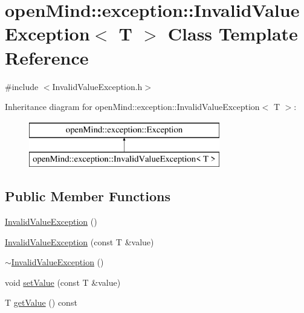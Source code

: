 \hypertarget{classopen_mind_1_1exception_1_1_invalid_value_exception}{\section{open\+Mind\+:\+:exception\+:\+:Invalid\+Value\+Exception$<$ T $>$ Class Template Reference}
\label{classopen_mind_1_1exception_1_1_invalid_value_exception}
}


{\ttfamily \#include $<$Invalid\+Value\+Exception.\+h$>$}

Inheritance diagram for open\+Mind\+:\+:exception\+:\+:Invalid\+Value\+Exception$<$ T $>$\+:\begin{figure}[H]
\begin{center}
\leavevmode
\includegraphics[height=2.000000cm]{classopen_mind_1_1exception_1_1_invalid_value_exception}
\end{center}
\end{figure}
\subsection*{Public Member Functions}
\begin{DoxyCompactItemize}
\item 
\hyperlink{classopen_mind_1_1exception_1_1_invalid_value_exception_a76941c40ec3cabdd0396138cd00471b6}{Invalid\+Value\+Exception} ()
\item 
\hyperlink{classopen_mind_1_1exception_1_1_invalid_value_exception_a30f06e903fb469a3317b7663a714f359}{Invalid\+Value\+Exception} (const T \&value)
\item 
\hyperlink{classopen_mind_1_1exception_1_1_invalid_value_exception_aceb1c7e40dd87bdfe095419994e11b30}{$\sim$\+Invalid\+Value\+Exception} ()
\item 
void \hyperlink{classopen_mind_1_1exception_1_1_invalid_value_exception_a2cec4d6ba69079526b2dff38ac3b5640}{set\+Value} (const T \&value)
\item 
T \hyperlink{classopen_mind_1_1exception_1_1_invalid_value_exception_aebf01f07e7550bc407d3cadc8facedde}{get\+Value} () const 
\end{DoxyCompactItemize}


